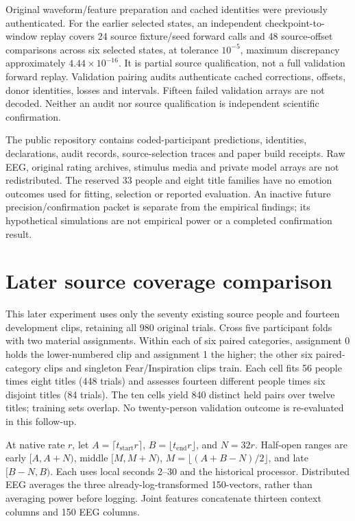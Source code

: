 \documentclass[10pt,a4paper]{article}
\begin{document}
Original waveform/feature preparation and cached identities were previously authenticated. For the earlier selected states, an independent checkpoint-to-window replay covers 24 source fixture/seed forward calls and 48 source-offset comparisons across six selected states, at tolerance \(10^{-5}\), maximum discrepancy approximately \(4.44\times10^{-16}\). It is partial source qualification, not a full validation forward replay. Validation pairing audits authenticate cached corrections, offsets, donor identities, losses and intervals. Fifteen failed validation arrays are not decoded. Neither an audit nor source qualification is independent scientific confirmation.

The public repository contains coded-participant predictions, identities, declarations, audit records, source-selection traces and paper build receipts. Raw EEG, original rating archives, stimulus media and private model arrays are not redistributed. The reserved 33 people and eight title families have no emotion outcomes used for fitting, selection or reported evaluation. An inactive future precision/confirmation packet is separate from the empirical findings; its hypothetical simulations are not empirical power or a completed confirmation result.

\section{Later source coverage comparison}
This later experiment uses only the seventy existing source people and fourteen development clips, retaining all 980 original trials. Cross five participant folds with two material assignments. Within each of six paired categories, assignment 0 holds the lower-numbered clip and assignment 1 the higher; the other six paired-category clips and singleton Fear/Inspiration clips train. Each cell fits 56 people times eight titles (448 trials) and assesses fourteen different people times six disjoint titles (84 trials). The ten cells yield 840 distinct held pairs over twelve titles; training sets overlap. No twenty-person validation outcome is re-evaluated in this follow-up.

At native rate \(r\), let \(A=\lceil t_\mathrm{start}r\rceil\), \(B=\lfloor t_\mathrm{end}r\rfloor\), and \(N=32r\). Half-open ranges are early \([A,A+N)\), middle \([M,M+N)\), \(M=\lfloor(A+B-N)/2\rfloor\), and late \([B-N,B)\). Each uses local seconds 2--30 and the historical processor. Distributed EEG averages the three already-log-transformed 150-vectors, rather than averaging power before logging. Joint features concatenate thirteen context columns and 150 EEG columns.
\end{document}
